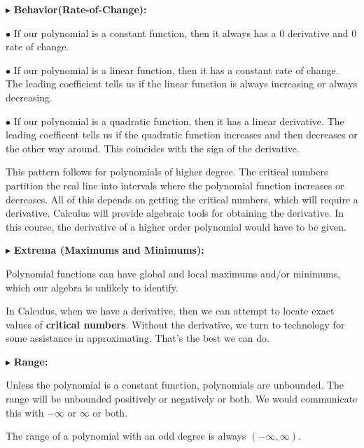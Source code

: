 \documentclass{ximera}
\begin{document}
$\blacktriangleright$ \textbf{\textcolor{red!10!blue!90!}{Behavior(Rate-of-Change):}} 



\textbf{\textcolor{blue!55!black}{$\bullet$}} If our polynomial is a constant function, then it always has a $0$ derivative and $0$ rate of change.


\textbf{\textcolor{blue!55!black}{$\bullet$}} If our polynomial is a linear function, then it has a constant rate of change. The leading coefficient tells us if the linear function is always increasing or always decreasing.


\textbf{\textcolor{blue!55!black}{$\bullet$}} If our polynomial is a quadratic function, then it has a linear derivative. The leading coefficent tells us if the quadratic function increases and then decreases or the other way around.  This coincides with the sign of the derivative.


This pattern follows for polynomials of higher degree. The critical numbers partition the real line into intervals where the polynomial function increases or decreases.  All of this depends on getting the critical numbers, which will require a derivative.  Calculus will provide algebraic tools for obtaining the derivative. In this course, the derivative of a higher order polynomial would have to be given.










$\blacktriangleright$  \textbf{\textcolor{red!10!blue!90!}{Extrema (Maximums and Minimums):}} 


Polynomial functions can have global and local maximums and/or minimums, which our algebra is unlikely to identify. 

 In Calculus, when we have a derivative, then we can attempt to locate exact values of \textbf{critical numbers}.  Without the derivative, we turn to technology for some assistance in approximating.  That's the best we can do.






$\blacktriangleright$  \textbf{\textcolor{red!10!blue!90!}{Range:}} 


Unless the polynomial is a constant function, polynomials are unbounded.  The range will be unbounded positively or negatively or both.  We would communicate this with $-\infty$ or $\infty$ or both.  

The range of a polynomial with an odd degree is always $(-\infty, \infty)$. 
\end{document}
